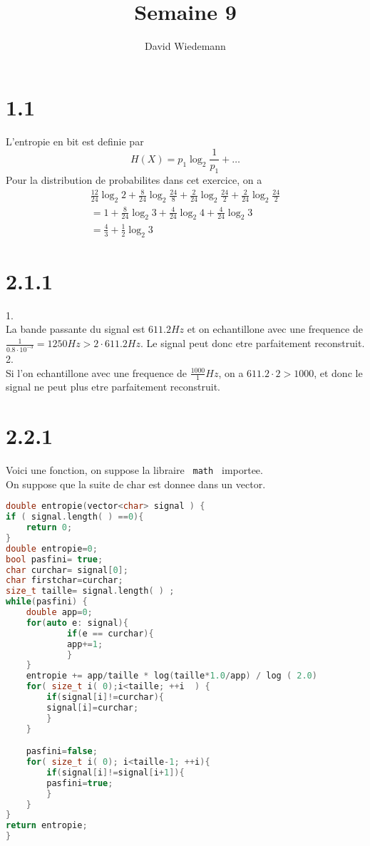 \documentclass[11pt, a4paper, twoside]{article}
\begin{document}
\title{Semaine 9}
\author{David Wiedemann}
\maketitle
\section*{1.1}
L'entropie en bit est definie par
\[ 
	H( X) = p_1 \log_2 \frac{1}{p_1} + \ldots
\]
Pour la distribution de probabilites dans cet exercice, on a
\begin{align*}
\frac{12}{24} \log_2 2 + \frac{8}{24}\log_2 \frac{24}{8} + \frac{2}{24} \log_2 \frac{24}{2}  + \frac{2}{24} \log_2 \frac{24}{2}\\
= 1 + \frac{8}{24}\log_2 3 + \frac{4}{24} \log_2 4 +\frac{4}{24} \log_2 3\\
= \frac{4}{3} + \frac{1}{2} \log_2 3
\end{align*}
\section*{2.1.1}
1.\\
La bande passante du signal est $611.2 Hz$ et on echantillone avec une frequence de $ \frac{1}{0.8 \cdot 10^{-3}}= 1250 Hz > 2 \cdot 611.2 Hz$. Le signal peut donc etre parfaitement reconstruit.\\
2.\\
Si l'on echantillone avec une frequence de $ \frac{1000}{1} Hz$, on a $611.2 \cdot 2 > 1000$, et donc le signal ne peut plus etre parfaitement reconstruit.
\section*{2.2.1}
Voici une fonction, on suppose la libraire \texttt{ math } importee.\\
On suppose que la suite de char est donnee dans un vector.
\begin{lstlisting}[language=c]
double entropie(vector<char> signal ) { 
if ( signal.length( ) ==0){  
	return 0;
}
double entropie=0;
bool pasfini= true;
char curchar= signal[0];
char firstchar=curchar;
size_t taille= signal.length( ) ;
while(pasfini) {
	double app=0;
	for(auto e: signal){
			if(e == curchar){
			app+=1;
			} 
	}
	entropie += app/taille * log(taille*1.0/app) / log ( 2.0) 
	for( size_t i( 0);i<taille; ++i  ) { 
		if(signal[i]!=curchar){
		signal[i]=curchar;
		}
	} 

	pasfini=false;
	for( size_t i( 0); i<taille-1; ++i){
		if(signal[i]!=signal[i+1]){
		pasfini=true;
		}
	}
} 
return entropie;
}
\end{lstlisting}
\end{document}
